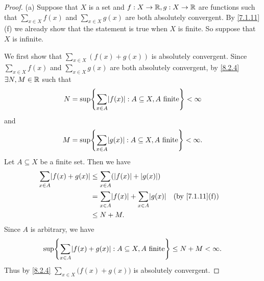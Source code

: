 \begin{proof}{(a)}
  Suppose that \(X\) is a set and \(f : X \to \mathbb{R}, g : X \to \mathbb{R}\) are functions such that \(\sum_{x \in X} f(x)\) and \(\sum_{x \in X} g(x)\) are both absolutely convergent.
  By \cref{7.1.11}(f) we already show that the statement is true when \(X\) is finite.
  So suppose that \(X\) is infinite.

  We first show that \(\sum_{x \in X} (f(x) + g(x))\) is absolutely convergent.
  Since \(\sum_{x \in X} f(x)\) and \(\sum_{x \in X} g(x)\) are both absolutely convergent, by \cref{8.2.4} \(\exists N, M \in \mathbb{R}\) such that
  \[
    N = \sup\set{\sum_{x \in A} \abs{f(x)} : A \subseteq X, A \text{ finite}} < \infty
  \]
  and
  \[
    M = \sup\set{\sum_{x \in A} \abs{g(x)} : A \subseteq X, A \text{ finite}} < \infty.
  \]
  Let \(A \subseteq X\) be a finite set.
  Then we have
  \begin{align*}
    \sum_{x \in A} \abs{f(x) + g(x)} & \leq \sum_{x \in A} (\abs{f(x)} + \abs{g(x)})                                             \\
                                     & = \sum_{x \in A} \abs{f(x)} + \sum_{x \in A} \abs{g(x)} &  & \text{(by \cref{7.1.11}(f))} \\
                                     & \leq N + M.
  \end{align*}
  Since \(A\) is arbitrary, we have
  \[
    \sup\set{\sum_{x \in A} \abs{f(x) + g(x)} : A \subseteq X, A \text{ finite}} \leq N + M < \infty.
  \]
  Thus by \cref{8.2.4} \(\sum_{x \in X} \big(f(x) + g(x)\big)\) is absolutely convergent.


\end{proof}
